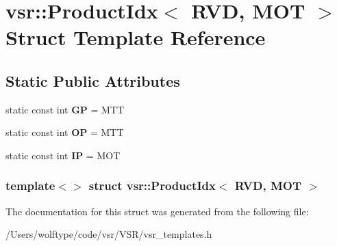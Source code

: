 \hypertarget{structvsr_1_1_product_idx_3_01_r_v_d_00_01_m_o_t_01_4}{\section{vsr\-:\-:Product\-Idx$<$ R\-V\-D, M\-O\-T $>$ Struct Template Reference}
\label{structvsr_1_1_product_idx_3_01_r_v_d_00_01_m_o_t_01_4}
}
\subsection*{Static Public Attributes}
\begin{DoxyCompactItemize}
\item 
\hypertarget{structvsr_1_1_product_idx_3_01_r_v_d_00_01_m_o_t_01_4_aa83e826ea3b2fea785efdf02a1e34670}{static const int {\bfseries G\-P} = M\-T\-T}\label{structvsr_1_1_product_idx_3_01_r_v_d_00_01_m_o_t_01_4_aa83e826ea3b2fea785efdf02a1e34670}

\item 
\hypertarget{structvsr_1_1_product_idx_3_01_r_v_d_00_01_m_o_t_01_4_ac8cca2693abb283d443f513ad6e120fa}{static const int {\bfseries O\-P} = M\-T\-T}\label{structvsr_1_1_product_idx_3_01_r_v_d_00_01_m_o_t_01_4_ac8cca2693abb283d443f513ad6e120fa}

\item 
\hypertarget{structvsr_1_1_product_idx_3_01_r_v_d_00_01_m_o_t_01_4_a1093f13655b9c47ec67f3f0e8097c6f4}{static const int {\bfseries I\-P} = M\-O\-T}\label{structvsr_1_1_product_idx_3_01_r_v_d_00_01_m_o_t_01_4_a1093f13655b9c47ec67f3f0e8097c6f4}

\end{DoxyCompactItemize}
\subsubsection*{template$<$$>$ struct vsr\-::\-Product\-Idx$<$ R\-V\-D, M\-O\-T $>$}



The documentation for this struct was generated from the following file\-:\begin{DoxyCompactItemize}
\item 
/\-Users/wolftype/code/vsr/\-V\-S\-R/vsr\-\_\-templates.\-h\end{DoxyCompactItemize}
